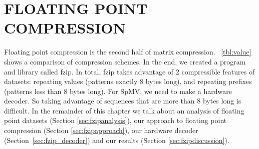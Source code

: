 \chapter{FLOATING POINT COMPRESSION}
\label{chp:fzip}
\newif\ifshort

\shorttrue

\newif\ifbwtsec

\bwtsecfalse
Floating point compression is the second half of matrix compression. \figurename~\ref{tbl:value} shows a comparison of compression schemes. In the end, we created a program and library called fzip. In total, fzip takes advantage of 2 compressible features of datasets: repeating values (patterns exactly 8 bytes long), and repeating prefixes (patterns less than 8 bytes long). For SpMV, we need to make a hardware decoder. So taking advantage of sequences that are more than 8 bytes long is difficult. In the remainder of this chapter we talk about an analysis of floating point datasets (Section \ref{sec:fzipanalysis}), our approach to floating point compression (Section \ref{sec:fzipapproach}), our hardware decoder (Section~\ref{sec:fzip_decoder}) and our results (Section \ref{sec:fzipdiscussion}).

